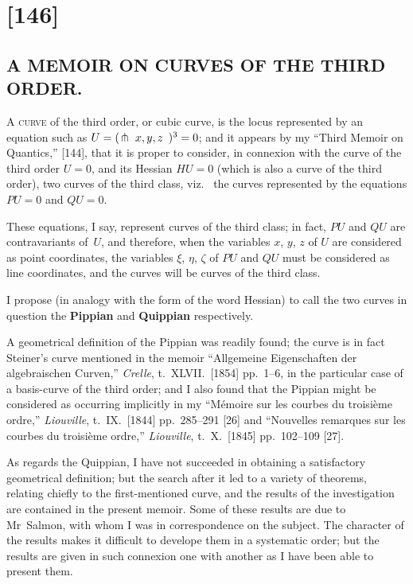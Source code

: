 \documentclass[12pt,a4paper]{article}
\theoremstyle{definition}
\newcommand{\viz}{viz.\ }
\begin{document}
\section*{[146]}
\subsection*{A MEMOIR ON CURVES OF THE THIRD ORDER.}


\medskip
A \textsc{curve} of the third order, or cubic curve, is the locus
represented by an equation such as $U = (\,\pitchfork\!\,\mathord{\mkern1mu\vrule\mkern1mu}\, x, y, z \,\mathord{\mkern1mu\vrule\mkern1mu}\,)^{3} = 0$;
and it appears by my ``Third Memoir on Quantics,'' [144],
that it is proper to consider, in connexion with the curve of
the third order $U = 0$, and its Hessian $HU = 0$ (which is also
a curve of the third order), two curves of the third class, \viz{}
the curves represented by the equations $PU = 0$ and $QU = 0$.

These equations, I say, represent curves of the third class;
in fact, $PU$ and $QU$ are contravariants of~$U$, and therefore,
when the variables $x$, $y$, $z$ of $U$ are considered as point
coordinates, the variables $\xi$, $\eta$, $\zeta$ of $PU$ and $QU$ must
be considered as line coordinates, and the curves will be curves
of the third class.

I propose (in analogy with the form of the word Hessian) to
call the two curves in question the \textbf{Pippian} and \textbf{Quippian}
respectively.

\medskip
[The curve $PU = 0$ is now usually called the \textbf{Cayleyan}.]

\medskip
A geometrical definition of the Pippian was readily found;
the curve is in fact Steiner's curve mentioned in the memoir
``Allgemeine Eigenschaften der algebraischen Curven,''
\textit{Crelle}, t.~XLVII.\ [1854] pp.~1--6, in the particular case of a
basis-curve of the third order; and I also found that the
Pippian might be considered as occurring implicitly in my
``M\'{e}moire sur les courbes du troisi\`{e}me ordre,'' \textit{Liouville},
t.~IX.\ [1844] pp.~285--291 [26] and ``Nouvelles remarques
sur les courbes du troisi\`{e}me ordre,'' \textit{Liouville}, t.~X.\ [1845]
pp.~102--109 [27].

As regards the Quippian, I have not succeeded in obtaining
a satisfactory geometrical definition; but the search after it
led to a variety of theorems, relating chiefly to the first-mentioned
curve, and the results of the investigation are contained in the
present memoir. Some of these results are due to Mr~Salmon,
with whom I was in correspondence on the subject. The character
of the results makes it difficult to develope them in a systematic
order; but the results are given in such connexion one with
another as I have been able to present them.
\end{document}
